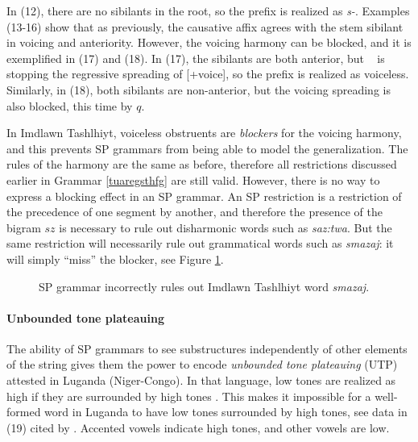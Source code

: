 In (12), there are no sibilants in the root, so the prefix is realized as \emph{s-}.
Examples (13-16) show that as previously, the causative affix agrees with the stem sibilant in voicing and anteriority.
However, the voicing harmony can be blocked, and it is exemplified in (17) and (18).
In (17), the sibilants are both anterior, but \textchi~ is stopping the regressive spreading of [+voice], so the prefix is realized as voiceless.
Similarly, in (18), both sibilants are non-anterior, but the voicing spreading is also blocked, this time by $q$. 

In Imdlawn Tashlhiyt, voiceless obstruents are \emph{blockers} for the voicing harmony, and this prevents SP grammars from being able to model the generalization.
The rules of the harmony are the same as before, therefore all restrictions discussed earlier in Grammar \ref{tuaregsthfg} are still valid.
However, there is no way to express a blocking effect in an SP grammar.
An SP restriction is a restriction of the precedence of one segment by another, and therefore the presence of the bigram $sz$ is necessary to rule out disharmonic words such as \emph{saz:twa}.
But the same restriction will necessarily rule out grammatical words such as \emph{sm\textchi azaj}: it will simply ``miss'' the blocker, see Figure \ref{imdlawnbadsp}.


\begin{figure}[h!]
\begin{center}
\end{center}
\caption{SP grammar incorrectly rules out Imdlawn Tashlhiyt word \emph{sm\textchi azaj}.}
\label{imdlawnbadsp}
\end{figure}

\paragraph{Unbounded tone plateauing}
The ability of SP grammars to see substructures independently of other elements of the string gives them the power to encode \emph{unbounded tone plateauing} (UTP) attested in Luganda (Niger-Congo).
In that language, low tones are realized as high if they are surrounded by high tones \citep{HymanKatamba2010}.
This makes it impossible for a well-formed word in Luganda to have low tones surrounded by high tones, see data in (19) cited by \citep{Hyman2011,Jardine2016}.
Accented vowels indicate high tones, and other vowels are low.

